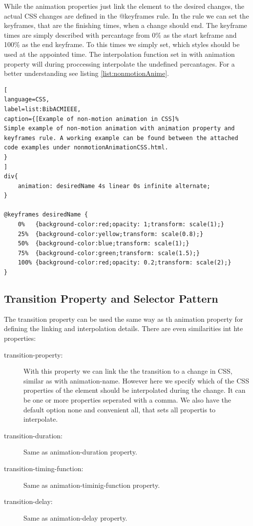 While the animation properties just link the element to the desired changes, the actual CSS changes are defined in the @keyframes rule. In the rule we can set the keyframes, that are the finishing times, when a change should end. The keyframe times are simply described with percantage from 0\% as the start keframe and 100\% as the end keyframe. To this times we simply set, which styles should be used at the appointed time. The interpolation function set in with animation property will during proccessing interpolate the undefined percantages. For a better understanding see listing \ref{list:nonmotionAnime}.


\begin{lstlisting}[
language=CSS,
label=list:BibACMIEEE,
caption={[Example of non-motion animation in CSS]%
Simple example of non-motion animation with animation property and keyframes rule. A working example can be found between the attached code examples under nonmotionAnimationCSS.html.
}
]
div{
	animation: desiredName 4s linear 0s infinite alternate;
}

@keyframes desiredName {
	0%   {background-color:red;opacity: 1;transform: scale(1);}
	25%  {background-color:yellow;transform: scale(0.8);}
	50%  {background-color:blue;transform: scale(1);}
	75%  {background-color:green;transform: scale(1.5);}
	100% {background-color:red;opacity: 0.2;transform: scale(2);}
}
\end{lstlisting}
\label{list:nonmotionAnime}

\subsection{Transition Property and Selector Pattern} %
\label{sub:CSS_transition}

The transition property can be used the same way as th animation property for defining the linking and interpolation details. There are even similarities int hte properties:

\begin{description}
\item [transition-property:] With this property we can link the the transition to a change in CSS, similar as with animation-name. However here we specify which of the CSS properties of the element should be interpolated during the change. It can be one or more properties seperated with a comma. We also have the default option none and convenient all, that sets all propertis to interpolate.
\item [transition-duration:] Same as animation-duration property.
\item [transition-timing-function:] Same as animation-timinig-function property.
\item [transition-delay:] Same as animation-delay property.
\end{description}

